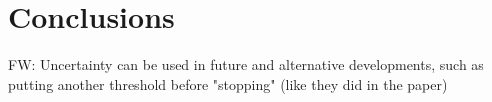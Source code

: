 \chapter{Conclusions}
\label{cha:conclusions}

FW: Uncertainty can be used in future and alternative developments, such as
putting another threshold before "stopping" (like they did in the paper)